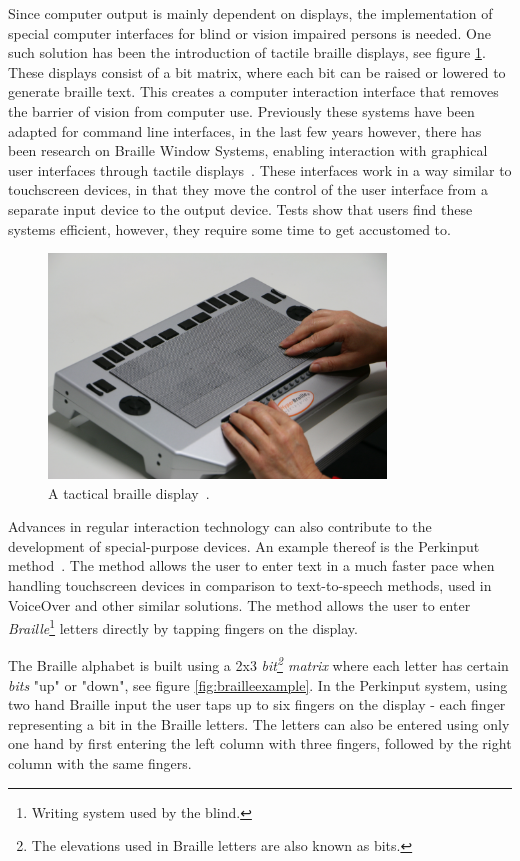 Since computer output is mainly dependent on displays, the implementation of special computer interfaces for blind or vision impaired persons is needed. One such solution has been the introduction of tactile braille displays, see figure \ref{braille}. These displays consist of a bit matrix, where each bit can be raised or lowered to generate braille text. This creates a computer interaction interface that removes the barrier of vision from computer use. Previously these systems have been adapted for command line interfaces, in the last few years however, there has been research on Braille Window Systems, enabling interaction with graphical user interfaces through tactile displays~\cite{prescher2010tactile, conf/petra/SturmSKJ09}. These interfaces work in a way similar to touchscreen devices, in that they move the control of the user interface from a separate input device to the output device. Tests show that users find these systems efficient, however, they require some time to get accustomed to.

\begin{figure}[h!]
\center
\includegraphics[width=0.8\textwidth] {bilder/IMG_7722.JPG}
\caption{A tactical braille display~\cite{brailledisplay}.}
\label{braille}
\end{figure}

Advances in regular interaction technology can also contribute to the development of special-purpose devices. An example thereof is the Perkinput method~\cite{azenkot}. The method allows the user to enter text in a much faster pace when handling touchscreen devices in comparison to text-to-speech methods, used in VoiceOver and other similar solutions. The method allows the user to enter \emph{Braille}\footnote{Writing system used by the blind.} letters directly by tapping fingers on the display.

The Braille alphabet is built using a 2x3 \emph{bit\footnote{The elevations used in Braille letters are also known as bits.} matrix} where each letter has certain \emph{bits} "up" or "down", see figure \ref{fig:brailleexample}. In the Perkinput system, using two hand Braille input the user taps up to six fingers on the display - each finger representing a bit in the Braille letters. The letters can also be entered using only one hand by first entering the left column with three fingers, followed by the right column with the same fingers.


